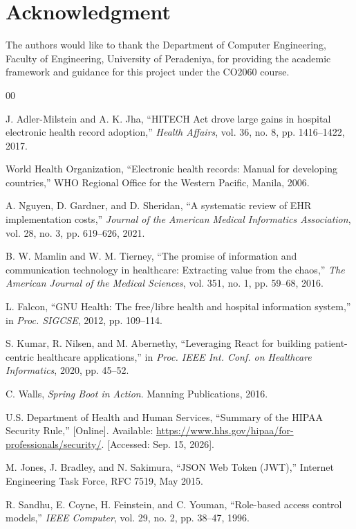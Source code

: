 \documentclass[conference]{IEEEtran}
\begin{document}
\section*{Acknowledgment}
The authors would like to thank the Department of Computer Engineering, Faculty of Engineering, University of Peradeniya, for providing the academic framework and guidance for this project under the CO2060 course.

\begin{thebibliography}{00}

 J. Adler-Milstein and A. K. Jha, ``HITECH Act drove large gains in hospital electronic health record adoption,'' \textit{Health Affairs}, vol. 36, no. 8, pp. 1416--1422, 2017.

 World Health Organization, ``Electronic health records: Manual for developing countries,'' WHO Regional Office for the Western Pacific, Manila, 2006.

 A. Nguyen, D. Gardner, and D. Sheridan, ``A systematic review of EHR implementation costs,'' \textit{Journal of the American Medical Informatics Association}, vol. 28, no. 3, pp. 619--626, 2021.

 B. W. Mamlin and W. M. Tierney, ``The promise of information and communication technology in healthcare: Extracting value from the chaos,'' \textit{The American Journal of the Medical Sciences}, vol. 351, no. 1, pp. 59--68, 2016.

 L. Falcon, ``GNU Health: The free/libre health and hospital information system,'' in \textit{Proc. SIGCSE}, 2012, pp. 109--114.

 S. Kumar, R. Nilsen, and M. Abernethy, ``Leveraging React for building patient-centric healthcare applications,'' in \textit{Proc. IEEE Int. Conf. on Healthcare Informatics}, 2020, pp. 45--52.

 C. Walls, \textit{Spring Boot in Action}. Manning Publications, 2016.

 U.S. Department of Health and Human Services, ``Summary of the HIPAA Security Rule,'' [Online]. Available: \url{https://www.hhs.gov/hipaa/for-professionals/security/}. [Accessed: Sep. 15, 2026].

 M. Jones, J. Bradley, and N. Sakimura, ``JSON Web Token (JWT),'' Internet Engineering Task Force, RFC 7519, May 2015.

 R. Sandhu, E. Coyne, H. Feinstein, and C. Youman, ``Role-based access control models,'' \textit{IEEE Computer}, vol. 29, no. 2, pp. 38--47, 1996.

\end{thebibliography}
\end{document}
